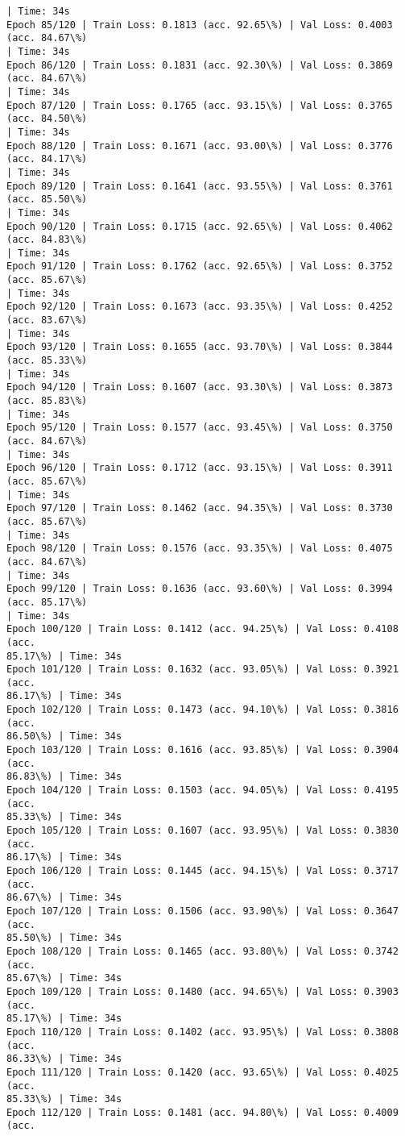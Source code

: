 \documentclass[8pt]{extarticle}
\begin{document}
\begin{Verbatim}[commandchars=\\\{\}]
| Time: 34s
Epoch 85/120 | Train Loss: 0.1813 (acc. 92.65\%) | Val Loss: 0.4003 (acc. 84.67\%)
| Time: 34s
Epoch 86/120 | Train Loss: 0.1831 (acc. 92.30\%) | Val Loss: 0.3869 (acc. 84.67\%)
| Time: 34s
Epoch 87/120 | Train Loss: 0.1765 (acc. 93.15\%) | Val Loss: 0.3765 (acc. 84.50\%)
| Time: 34s
Epoch 88/120 | Train Loss: 0.1671 (acc. 93.00\%) | Val Loss: 0.3776 (acc. 84.17\%)
| Time: 34s
Epoch 89/120 | Train Loss: 0.1641 (acc. 93.55\%) | Val Loss: 0.3761 (acc. 85.50\%)
| Time: 34s
Epoch 90/120 | Train Loss: 0.1715 (acc. 92.65\%) | Val Loss: 0.4062 (acc. 84.83\%)
| Time: 34s
Epoch 91/120 | Train Loss: 0.1762 (acc. 92.65\%) | Val Loss: 0.3752 (acc. 85.67\%)
| Time: 34s
Epoch 92/120 | Train Loss: 0.1673 (acc. 93.35\%) | Val Loss: 0.4252 (acc. 83.67\%)
| Time: 34s
Epoch 93/120 | Train Loss: 0.1655 (acc. 93.70\%) | Val Loss: 0.3844 (acc. 85.33\%)
| Time: 34s
Epoch 94/120 | Train Loss: 0.1607 (acc. 93.30\%) | Val Loss: 0.3873 (acc. 85.83\%)
| Time: 34s
Epoch 95/120 | Train Loss: 0.1577 (acc. 93.45\%) | Val Loss: 0.3750 (acc. 84.67\%)
| Time: 34s
Epoch 96/120 | Train Loss: 0.1712 (acc. 93.15\%) | Val Loss: 0.3911 (acc. 85.67\%)
| Time: 34s
Epoch 97/120 | Train Loss: 0.1462 (acc. 94.35\%) | Val Loss: 0.3730 (acc. 85.67\%)
| Time: 34s
Epoch 98/120 | Train Loss: 0.1576 (acc. 93.35\%) | Val Loss: 0.4075 (acc. 84.67\%)
| Time: 34s
Epoch 99/120 | Train Loss: 0.1636 (acc. 93.60\%) | Val Loss: 0.3994 (acc. 85.17\%)
| Time: 34s
Epoch 100/120 | Train Loss: 0.1412 (acc. 94.25\%) | Val Loss: 0.4108 (acc.
85.17\%) | Time: 34s
Epoch 101/120 | Train Loss: 0.1632 (acc. 93.05\%) | Val Loss: 0.3921 (acc.
86.17\%) | Time: 34s
Epoch 102/120 | Train Loss: 0.1473 (acc. 94.10\%) | Val Loss: 0.3816 (acc.
86.50\%) | Time: 34s
Epoch 103/120 | Train Loss: 0.1616 (acc. 93.85\%) | Val Loss: 0.3904 (acc.
86.83\%) | Time: 34s
Epoch 104/120 | Train Loss: 0.1503 (acc. 94.05\%) | Val Loss: 0.4195 (acc.
85.33\%) | Time: 34s
Epoch 105/120 | Train Loss: 0.1607 (acc. 93.95\%) | Val Loss: 0.3830 (acc.
86.17\%) | Time: 34s
Epoch 106/120 | Train Loss: 0.1445 (acc. 94.15\%) | Val Loss: 0.3717 (acc.
86.67\%) | Time: 34s
Epoch 107/120 | Train Loss: 0.1506 (acc. 93.90\%) | Val Loss: 0.3647 (acc.
85.50\%) | Time: 34s
Epoch 108/120 | Train Loss: 0.1465 (acc. 93.80\%) | Val Loss: 0.3742 (acc.
85.67\%) | Time: 34s
Epoch 109/120 | Train Loss: 0.1480 (acc. 94.65\%) | Val Loss: 0.3903 (acc.
85.17\%) | Time: 34s
Epoch 110/120 | Train Loss: 0.1402 (acc. 93.95\%) | Val Loss: 0.3808 (acc.
86.33\%) | Time: 34s
Epoch 111/120 | Train Loss: 0.1420 (acc. 93.65\%) | Val Loss: 0.4025 (acc.
85.33\%) | Time: 34s
Epoch 112/120 | Train Loss: 0.1481 (acc. 94.80\%) | Val Loss: 0.4009 (acc.

\end{Verbatim}
\end{document}

